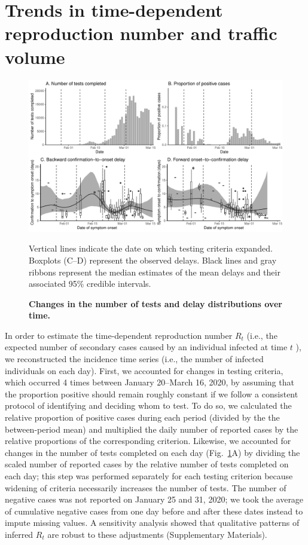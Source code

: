 \documentclass[12pt]{article}
\newcommand{\fref}[1]{Fig.~\ref{fig:#1}}
\begin{document}

\section{Trends in time-dependent reproduction number and traffic volume}

\begin{figure}
\includegraphics[width=\textwidth]{figure_report_delay.pdf}
\caption{
\textbf{Changes in the number of tests and delay distributions over time.}
}
Vertical lines indicate the date on which testing criteria expanded.
Boxplots (C--D) represent the observed delays.
Black lines and gray ribbons represent the median estimates of the mean delays and their associated 95\% credible intervals.
\label{fig:dist}
\end{figure}

In order to estimate the time-dependent reproduction number $R_t$ (i.e., the expected number of secondary cases caused by an individual infected at time $t$ \citep{fraser2007estimating}), we reconstructed the incidence time series (i.e., the number of infected individuals on each day).
First, we accounted for changes in testing criteria, which occurred 4 times between January 20--March 16, 2020, by assuming that the proportion positive should remain roughly constant if we follow a consistent protocol of identifying and deciding whom to test.
To do so, we calculated the relative proportion of positive cases during each period (divided by the the between-period mean) and multiplied the daily number of reported cases by the relative proportions of the corresponding criterion.
Likewise, we accounted for changes in the number of tests completed on each day (\fref{dist}A) by dividing the scaled number of reported cases by the relative number of tests completed on each day; this step was performed separately for each testing criterion because widening of criteria necessarily increases the number of tests.
The number of negative cases was not reported on January 25 and 31, 2020; we took the average of cumulative negative cases from one day before and after these dates instead to impute missing values.
A sensitivity analysis showed that qualitative patterns of inferred $R_t$ are robust to these adjustments (Supplementary Materials).
\end{document}
